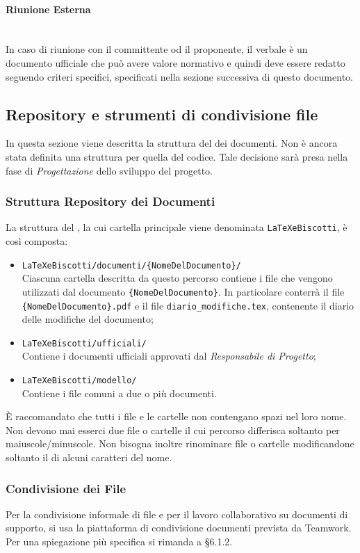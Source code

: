 \paragraph{Riunione Esterna}\mbox{}\\
In caso di riunione con il committente od il proponente, il verbale è un documento ufficiale che può avere valore normativo e quindi deve essere redatto seguendo criteri
specifici, specificati nella sezione successiva di questo documento. 

\subsection{Repository e strumenti di condivisione file}
In questa sezione viene descritta la struttura del  dei documenti. Non è ancora stata definita una struttura per quella del codice. Tale decisione sarà presa nella fase di \textit{Progettazione} dello sviluppo del progetto.
\subsubsection{Struttura Repository dei Documenti}
La struttura del , la cui cartella principale viene denominata \texttt{LaTeXeBiscotti}, è così composta:
\begin{itemize}
\item \texttt{LaTeXeBiscotti/documenti/\{NomeDelDocumento\}/} \\ 
Ciascuna cartella descritta da questo percorso contiene i file che vengono utilizzati dal documento \texttt{\{NomeDelDocumento\}}. In particolare conterrà il file \texttt{\{NomeDelDocumento\}.pdf}
e il file \texttt{diario\_modifiche.tex}, contenente il diario delle modifiche del documento;
\item \texttt{LaTeXeBiscotti/ufficiali/} \\
Contiene i documenti ufficiali approvati dal \textit{Responsabile di Progetto};
\item \texttt{LaTeXeBiscotti/modello/} \\
Contiene i file comuni a due o più documenti.
\end{itemize}
È raccomandato che tutti i file e le cartelle non contengano spazi nel loro nome. Non devono mai esserci due file o cartelle il cui percorso differisca soltanto per maiuscole/minuscole. Non bisogna inoltre rinominare file o cartelle modificandone soltanto il  di alcuni caratteri del nome.

\subsubsection{Condivisione dei File}
Per la condivisione informale di file e per il lavoro collaborativo su documenti di supporto, si usa la piattaforma di condivisione documenti prevista da Teamwork. Per una spiegazione più specifica si rimanda a §6.1.2.
